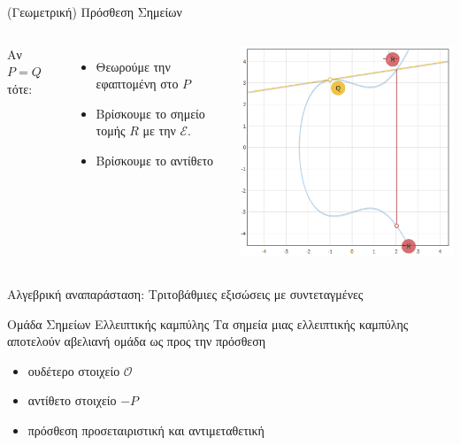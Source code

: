 \documentclass[handout]{beamer}
\begin{document}
\begin{frame}[allowframebreaks]{(Γεωμετρική) Πρόσθεση Σημείων}
\framebreak
\begin{columns}
Αν $P = Q$ τότε:
\begin{itemize}
\item Θεωρούμε την εφαπτομένη στο $P$
\item Βρίσκουμε το σημείο τομής $R$ με την $\mathcal{E}$.
\item Βρίσκουμε το αντίθετο
\end{itemize}
\begin{center}
\includegraphics[scale=0.5]{add_same.png} 
\end{center}
\end{columns}
Αλγεβρική αναπαράσταση: Τριτοβάθμιες εξισώσεις με συντεταγμένες
\end{frame}


\begin{frame}{Ομάδα Σημείων Ελλειπτικής καμπύλης}
Τα σημεία μιας ελλειπτικής καμπύλης αποτελούν αβελιανή ομάδα ως προς την πρόσθεση
\begin{itemize}
\item ουδέτερο στοιχείο $\mathcal{O}$
\item αντίθετο στοιχείο $-P$
\item πρόσθεση προσεταιριστική και αντιμεταθετική
\end{itemize}
\end{frame}
\end{document}
